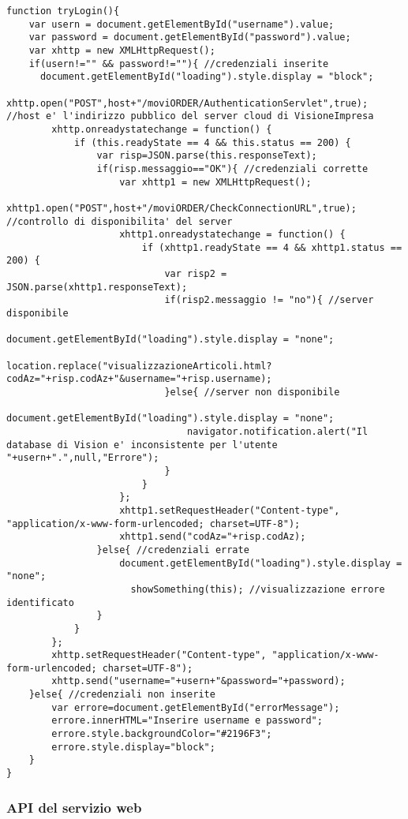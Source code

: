 \begin{lstlisting}[tabsize=2]
function tryLogin(){
	var usern = document.getElementById("username").value;
	var password = document.getElementById("password").value;
	var xhttp = new XMLHttpRequest();
	if(usern!="" && password!=""){ //credenziali inserite
	  document.getElementById("loading").style.display = "block";
		xhttp.open("POST",host+"/moviORDER/AuthenticationServlet",true); //host e' l'indirizzo pubblico del server cloud di VisioneImpresa
		xhttp.onreadystatechange = function() {
			if (this.readyState == 4 && this.status == 200) {
				var risp=JSON.parse(this.responseText);
				if(risp.messaggio=="OK"){ //credenziali corrette
				    var xhttp1 = new XMLHttpRequest();
				    xhttp1.open("POST",host+"/moviORDER/CheckConnectionURL",true); //controllo di disponibilita' del server
				    xhttp1.onreadystatechange = function() {
				        if (xhttp1.readyState == 4 && xhttp1.status == 200) {
				            var risp2 = JSON.parse(xhttp1.responseText);
				            if(risp2.messaggio != "no"){ //server disponibile
				                document.getElementById("loading").style.display = "none";
				                location.replace("visualizzazioneArticoli.html?codAz="+risp.codAz+"&username="+risp.username);
				            }else{ //server non disponibile
				                document.getElementById("loading").style.display = "none";
				                navigator.notification.alert("Il database di Vision e' inconsistente per l'utente "+usern+".",null,"Errore");
				            }
				        }
				    };
				    xhttp1.setRequestHeader("Content-type", "application/x-www-form-urlencoded; charset=UTF-8");
                    xhttp1.send("codAz="+risp.codAz);
				}else{ //credenziali errate
				    document.getElementById("loading").style.display = "none";
					  showSomething(this); //visualizzazione errore identificato
				}
			}
		};
		xhttp.setRequestHeader("Content-type", "application/x-www-form-urlencoded; charset=UTF-8");
		xhttp.send("username="+usern+"&password="+password);
	}else{ //credenziali non inserite
		var errore=document.getElementById("errorMessage");
		errore.innerHTML="Inserire username e password";
		errore.style.backgroundColor="#2196F3";
		errore.style.display="block";
	}
}
\end{lstlisting}

\subsubsection{API del servizio web}

